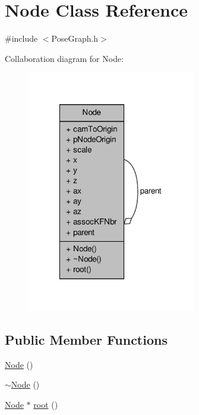 \hypertarget{classNode}{\section{\-Node \-Class \-Reference}
\label{classNode}
}


{\ttfamily \#include $<$\-Pose\-Graph.\-h$>$}



\-Collaboration diagram for \-Node\-:\nopagebreak
\begin{figure}[H]
\begin{center}
\leavevmode
\includegraphics[width=209pt]{classNode__coll__graph}
\end{center}
\end{figure}
\subsection*{\-Public \-Member \-Functions}
\begin{DoxyCompactItemize}
\item 
\hyperlink{classNode_ad7a34779cad45d997bfd6d3d8043c75f}{\-Node} ()
\item 
\hyperlink{classNode_aa0840c3cb5c7159be6d992adecd2097c}{$\sim$\-Node} ()
\item 
\hyperlink{classNode}{\-Node} $\ast$ \hyperlink{classNode_a9e417fbf8c05319b464890592e384e42}{root} ()
\end{DoxyCompactItemize}
